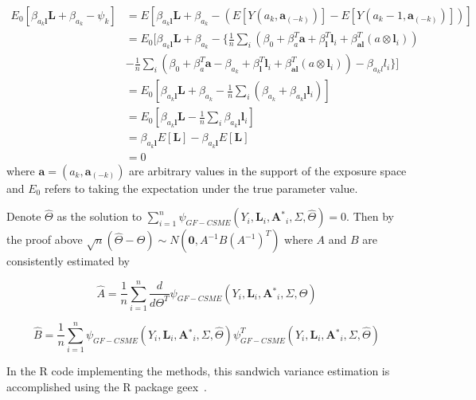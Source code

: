 \documentclass[12pt]{article}
\begin{document}
\begin{align*}
E_{0}[\beta_{a_{k}\textbf{l}}\textbf{L} + \beta_{a_{k}} - \psi_{k}] &= E[\beta_{a_{k}\textbf{l}}\textbf{L} + \beta_{a_{k}} - (E[Y(a_{k}, \textbf{a}_{(-k)})] - E[Y(a_{k} - 1, \textbf{a}_{(-k)})])] \\
&=E_{0}[\beta_{a_{k}\textbf{l}}\textbf{L} + \beta_{a_{k}} - \bigg \{ \frac{1}{n} \sum_{i} (\beta_{0} + \beta_{a}^{T}\textbf{a} + \beta_{\textbf{l}}^{T}\textbf{l}_{i} + \beta_{\textbf{al}}^{T}(a \otimes \textbf{l}_{i})) \\
&- \frac{1}{n} \sum_{i} (\beta_{0} + \beta_{a}^{T}\textbf{a} - \beta_{a_{k}} + \beta_{\textbf{l}}^{T}\textbf{l}_{i} + \beta_{\textbf{al}}^{T}(a \otimes \textbf{l}_{i})) - \beta_{a_{k}l}l_{i} \bigg \}] \\
&=E_{0}[\beta_{a_{k}\textbf{l}}\textbf{L} + \beta_{a_{k}} - \frac{1}{n}\sum_{i} (\beta_{a_{k}} + \beta_{a_{k}\textbf{l}}\textbf{l}_{i})] \\
&=E_{0}[\beta_{a_{k}\textbf{l}}\textbf{L} - \frac{1}{n}\sum_{i}\beta_{a_{k}\textbf{l}}\textbf{l}_{i}] \\
&=\beta_{a_{k}\textbf{l}}E[\textbf{L}] - \beta_{a_{k}\textbf{l}}E[\textbf{L}] \\
&=0
\end{align*}
where $\textbf{a} = (a_{k}, \textbf{a}_{(-k)})$ are arbitrary values in the support of the exposure space and $E_{0}$ refers to taking the expectation under the true parameter value.

Denote $\hat{\Theta}$ as the solution to $\sum_{i=1}^{n} \psi_{GF-CSME}(Y_{i}, \textbf{L}_{i}, \textbf{A$^{*}$}_{i}, \Sigma, \hat{\Theta}) = 0$. Then by the proof above $\sqrt{n}(\hat{\Theta} - \Theta) \sim N(\textbf{0}, A^{-1}B(A^{-1})^{T})$ where $A$ and $B$ are consistently estimated by

\begin{equation*}
\hat{A} = \frac{1}{n} \sum_{i=1}^{n} \frac{d}{d\Theta^{T}} \psi_{GF-CSME}(Y_{i}, \textbf{L}_{i}, \textbf{A$^{*}$}_{i}, \Sigma, \hat{\Theta})
\end{equation*}

\begin{equation*}
\hat{B} = \frac{1}{n} \sum_{i=1}^{n} \psi_{GF-CSME}(Y_{i}, \textbf{L}_{i}, \textbf{A$^{*}$}_{i}, \Sigma, \hat{\Theta}) \psi^{T}_{GF-CSME}(Y_{i}, \textbf{L}_{i}, \textbf{A$^{*}$}_{i}, \Sigma, \hat{\Theta})
\end{equation*}

In the R code implementing the methods, this sandwich variance estimation is accomplished using the R package geex~\citep{saul2017}.
\end{document}
